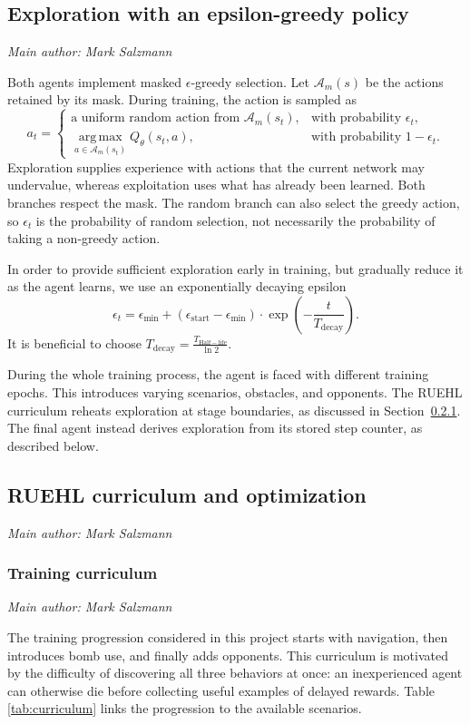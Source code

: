 \documentclass[11pt,a4paper]{article}
\newcommand{\contributionauthor}[1]{{\small\textit{Main author: #1}\par}}
\begin{document}
\subsection{Exploration with an epsilon-greedy policy}
\contributionauthor{Mark Salzmann}
Both agents implement masked $\epsilon$-greedy selection. Let $\mathcal{A}_m(s)$ be
the actions retained by its mask. During training, the action is sampled as
\begin{equation}
a_t=\begin{cases}
\text{a uniform random action from }\mathcal{A}_m(s_t),
& \text{with probability }\epsilon_t,\\
\displaystyle\operatorname*{arg\,max}_{a\in\mathcal{A}_m(s_t)}
Q_\theta(s_t,a), & \text{with probability }1-\epsilon_t.
\end{cases}
\end{equation}
Exploration supplies experience with actions that the current network may
undervalue, whereas exploitation uses what has already been learned. Both branches
respect the mask. The random branch can also select the greedy action, so
$\epsilon_t$ is the probability of random selection, not necessarily the
probability of taking a non-greedy action.

In order to provide sufficient exploration early in training, but gradually reduce it as the agent learns, we use an exponentially decaying epsilon
\begin{equation}
\epsilon_t=\epsilon_{\min}+
(\epsilon_{\mathrm{start}}-\epsilon_{\min}) \cdot \exp\left(-\frac{t}{T_{\mathrm{decay}}}\right).
\end{equation}
It is beneficial to choose $T_{\mathrm{decay}} = \frac{T_{\mathrm{Half-life}}}{\ln 2}$.

During the whole training process, the agent is faced with different training epochs. 
This introduces varying scenarios, obstacles, and opponents.
The RUEHL curriculum reheats exploration at stage boundaries, as discussed in Section~\ref{sec:curriculum}. The final agent instead derives exploration from its stored step counter, as described below.


\subsection{RUEHL curriculum and optimization}
\contributionauthor{Mark Salzmann}


\subsubsection{Training curriculum} \label{sec:curriculum}
\contributionauthor{Mark Salzmann}
The training progression considered in this project starts with navigation,
then introduces bomb use, and finally adds opponents. This curriculum is
motivated by the difficulty of discovering all three behaviors at once:
an inexperienced agent can otherwise die before collecting useful examples
of delayed rewards. Table \ref{tab:curriculum} links the progression to the
available scenarios.
\end{document}
